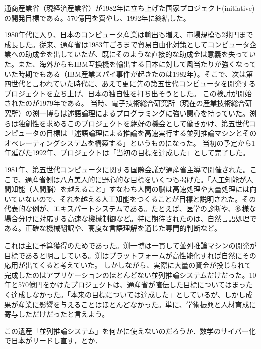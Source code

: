 \documentclass[uplatex, dvipdfmx]{jsreport}
\begin{document}
\begin{history}
    通商産業省（現経済産業省）が1982年に立ち上げた国家プロジェクト(initiative)の開発目標である。570億円を費やし、1992年に終結した。

    1980年代に入り、日本のコンピュータ産業は輸出も増え、市場規模も2兆円まで成長した。従来、通産省は1983年ごろまで貿易自由化対策としてコンピュータ企業への助成金を出していたが、既にそのような直接的な助成金は意義を失っていた。また、海外からもIBM互換機を輸出する日本に対して風当たりが強くなっていた時期でもある（IBM産業スパイ事件が起きたのは1982年）。そこで、次は第四世代と言われていた時代に、あえて更に先の第五世代コンピュータを開発するプロジェクトを立ち上げ、日本の独自性を打ち出そうとした。
    この検討が開始されたのが1979年である。
    当時、電子技術総合研究所（現在の産業技術総合研究所）の渕一博らは述語論理によるプログラミングに強い関心を持っていた。渕らは独創性を求めるこのプロジェクトを絶好の機会として働きかけ、第五世代コンピュータの目標は「述語論理による推論を高速実行する並列推論マシンとそのオペレーティングシステムを構築する」というものになった。
    当初の予定から1年延びた1992年、プロジェクトは「当初の目標を達成した」として完了した。
\end{history}
\begin{remark}[この時代の日本ぶいぶい言わせすぎじゃないか？？]
    1981年、第五世代コンピュータに関する国際会議が通産省主導で開催された。ここで、通産省側は八方美人的に野心的な目標をいくつも掲げた。「人工知能が人間知能（人間脳）を越えること」すなわち人間の脳は高速処理や大量処理には向いていないので、それを越える人工知能をつくることが目標と説明された。その代表的な例が、エキスパートシステムである。たとえば、医学の診断や、多様な場合分けに対応する高速な機械制御など。特に期待されたのは、自然言語処理である。正確な機械翻訳や、高度な言語理解を通じた専門的判断など。

    これは主に予算獲得のためであった。渕一博は一貫して並列推論マシンの開発が目標であると明言している。渕はプラットフォームが高性能化すれば自然にその応用が出てくると考えていた。
    しかしながら、実際に大量の資金が投じられて完成したのはアプリケーションのほとんどない並列推論システムだけだった。10年と570億円をかけたプロジェクトは、通産省が喧伝した目標についてはまったく達成しなかった。「本来の目標については達成した」としているが、しかし成果が産業に影響を与えることはほとんどなかった。単に、学術振興と人材育成に寄与しただけだったと言えよう。
\end{remark}
この遺産「並列推論システム」を何かに使えないのだろうか．数学のサイバー化で日本がリードし直す，とか．
\end{document}
